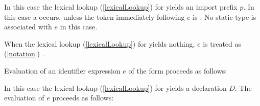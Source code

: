 \documentclass[makeidx]{article}
\begin{document}
{\LMHash{}%
In this case the lexical lookup
(\ref{lexicalLookup})
for \id{} yields an import prefix $p$.
In this case a  occurs,
unless the token immediately following $e$ is .
No static type is associated with $e$ in this case.

\EndCase

\LMHash{}%
When the lexical lookup
(\ref{lexicalLookup})
for \id{} yields nothing,
$e$ is treated as
(\ref{notation})
.

\EndCase

\LMHash{}%
Evaluation of an identifier expression $e$ of the form \id{}
proceeds as follows:

\LMHash{}%
In this case the lexical lookup
(\ref{lexicalLookup})
for \id{} yields a declaration $D$.
The evaluation of $e$ proceeds as follows:

}
\end{document}
